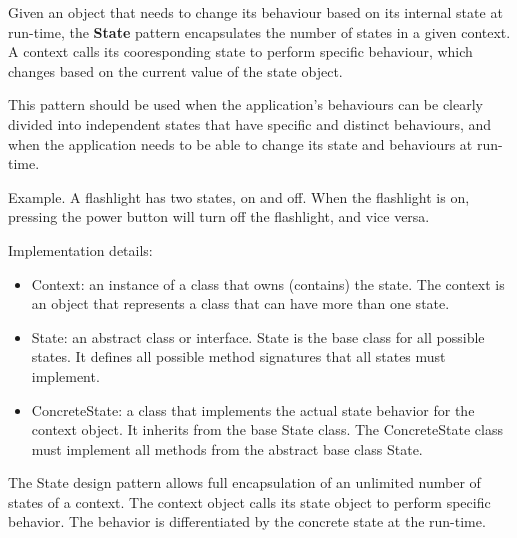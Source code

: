 \begin{summary}
    Given an object that needs to change its behaviour based on its
    internal state at run-time, the {\bf State} pattern encapsulates the number
    of states in a given context. A context calls its cooresponding
    state to perform specific behaviour, which changes based on the
    current value of the state object.

    This pattern should be used when the application's behaviours can be
    clearly divided into independent states that have specific and distinct
    behaviours, and when the application needs to be able to change its state
    and behaviours at run-time.

    Example. A flashlight has two states, on and off. When the flashlight is on,
    pressing the power button will turn off the flashlight, and vice versa.
\end{summary}

Implementation details: \begin{itemize}
    \item {\sc Context}: an instance of a class that owns (contains) the state.
        The context is an object that represents a class that can have more
        than one state.
    \item {\sc State}: an abstract class or interface. {\sc State} is the base
        class for all possible states. It defines all possible method
        signatures that all states must implement.
    \item {\sc ConcreteState}: a class that implements the actual state
        behavior for the context object. It inherits from the base {\sc State}
        class. The {\sc ConcreteState} class must implement all methods from
        the abstract base class {\sc State}.
\end{itemize}

The State design pattern allows full encapsulation of an unlimited number of
states of a context. The context object calls its state object to perform
specific behavior. The behavior is differentiated by the concrete state at the
run-time.

